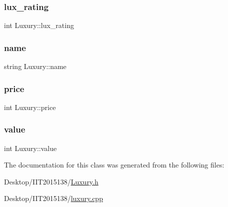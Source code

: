 \subsubsection{\texorpdfstring{lux\+\_\+rating}{lux\_rating}}
{\footnotesize\ttfamily int Luxury\+::lux\+\_\+rating\hspace{0.3cm}{\ttfamily [private]}}

\mbox{\label{classLuxury_af278b0f28797065ce17a277c6bb5b806}} 
\subsubsection{\texorpdfstring{name}{name}}
{\footnotesize\ttfamily string Luxury\+::name\hspace{0.3cm}{\ttfamily [private]}}

\mbox{\label{classLuxury_a4fddd3e1aa113496609a7ba24552763b}} 
\subsubsection{\texorpdfstring{price}{price}}
{\footnotesize\ttfamily int Luxury\+::price\hspace{0.3cm}{\ttfamily [private]}}

\mbox{\label{classLuxury_aa1ba63c4ce936dc65c41bfdca5af9c73}} 
\subsubsection{\texorpdfstring{value}{value}}
{\footnotesize\ttfamily int Luxury\+::value\hspace{0.3cm}{\ttfamily [private]}}



The documentation for this class was generated from the following files\+:\begin{DoxyCompactItemize}
\item 
Desktop/\+I\+I\+T2015138/\hyperlink{Luxury_8h}{Luxury.\+h}\item 
Desktop/\+I\+I\+T2015138/\hyperlink{luxury_8cpp}{luxury.\+cpp}\end{DoxyCompactItemize}
